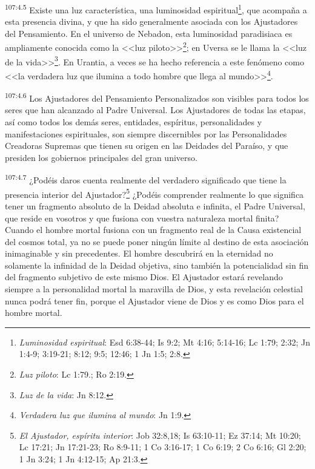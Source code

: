 \par
\textsuperscript{107:4.5} Existe una luz característica, una luminosidad espiritual\footnote{\textit{Luminosidad espiritual}: Esd 6:38-44; Is 9:2; Mt 4:16; 5:14-16; Lc 1:79; 2:32; Jn 1:4-9; 3:19-21; 8:12; 9:5; 12:46; 1 Jn 1:5; 2:8.}, que acompaña a esta presencia divina, y que ha sido generalmente asociada con los Ajustadores del Pensamiento. En el universo de Nebadon, esta luminosidad paradisiaca es ampliamente conocida como la <<luz piloto>>\footnote{\textit{Luz piloto}: Lc 1:79.; Ro 2:19.}; en Uversa se le llama la <<luz de la vida>>\footnote{\textit{Luz de la vida}: Jn 8:12.}. En Urantia, a veces se ha hecho referencia a este fenómeno como <<la verdadera luz que ilumina a todo hombre que llega al mundo>>\footnote{\textit{Verdadera luz que ilumina al mundo}: Jn 1:9.}.

\par
\textsuperscript{107:4.6} Los Ajustadores del Pensamiento Personalizados son visibles para todos los seres que han alcanzado al Padre Universal. Los Ajustadores de todas las etapas, así como todos los demás seres, entidades, espíritus, personalidades y manifestaciones espirituales, son siempre discernibles por las Personalidades Creadoras Supremas que tienen su origen en las Deidades del Paraíso, y que presiden los gobiernos principales del gran universo.

\par
\textsuperscript{107:4.7} ¿Podéis daros cuenta realmente del verdadero significado que tiene la presencia interior del Ajustador?\footnote{\textit{El Ajustador, espíritu interior}: Job 32:8,18; Is 63:10-11; Ez 37:14; Mt 10:20; Lc 17:21; Jn 17:21-23; Ro 8:9-11; 1 Co 3:16-17; 1 Co 6:19; 2 Co 6:16; Gl 2:20; 1 Jn 3:24; 1 Jn 4:12-15; Ap 21:3.} ¿Podéis comprender realmente lo que significa tener un fragmento absoluto de la Deidad absoluta e infinita, el Padre Universal, que reside en vosotros y que fusiona con vuestra naturaleza mortal finita? Cuando el hombre mortal fusiona con un fragmento real de la Causa existencial del cosmos total, ya no se puede poner ningún límite al destino de esta asociación inimaginable y sin precedentes. El hombre descubrirá en la eternidad no solamente la infinidad de la Deidad objetiva, sino también la potencialidad sin fin del fragmento subjetivo de este mismo Dios. El Ajustador estará revelando siempre a la personalidad mortal la maravilla de Dios, y esta revelación celestial nunca podrá tener fin, porque el Ajustador viene de Dios y es como Dios para el hombre mortal.

